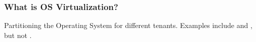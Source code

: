 \begin{frame}
\frametitle{What is OS Virtualization?}
	Partitioning the Operating System for different tenants. Examples include \cite{jails} and
	\cite{zones}, but not \cite{alto}.
\end{frame}
